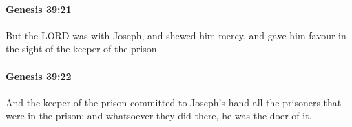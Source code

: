 		\paragraph{Genesis 39:21} %
			\label{GENESIS-39-21}

			But the LORD was with Joseph, and shewed him mercy, and gave him favour in the sight of the keeper of the prison.


		\paragraph{Genesis 39:22} %
			\label{GENESIS-39-22}

			And the keeper of the prison committed to Joseph's hand all the prisoners that were in the prison; and whatsoever they did there, he was the doer of it.


